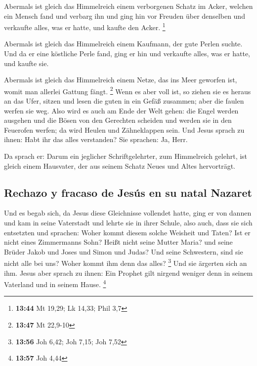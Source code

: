  Abermals ist gleich das Himmelreich einem verborgenen
Schatz im Acker, welchen ein Mensch fand und verbarg ihn und ging hin
vor Freuden über denselben und verkaufte alles, was er hatte, und kaufte
den Acker. \footnote{\textbf{13:44} Mt 19,29; Lk 14,33; Phil 3,7}

 Abermals ist gleich das Himmelreich einem Kaufmann, der
gute Perlen suchte.  Und da er eine köstliche Perle fand,
ging er hin und verkaufte alles, was er hatte, und kaufte sie.

 Abermals ist gleich das Himmelreich einem Netze, das ins
Meer geworfen ist, womit man allerlei Gattung fängt. \footnote{\textbf{13:47}
  Mt 22,9-10}  Wenn es aber voll ist, so ziehen sie es
heraus an das Ufer, sitzen und lesen die guten in ein Gefäß zusammen;
aber die faulen werfen sie weg.  Also wird es auch am
Ende der Welt gehen: die Engel werden ausgehen und die Bösen von den
Gerechten scheiden  und werden sie in den Feuerofen
werfen; da wird Heulen und Zähneklappen sein.  Und Jesus
sprach zu ihnen: Habt ihr das alles verstanden? Sie sprachen: Ja, Herr.

 Da sprach er: Darum ein jeglicher Schriftgelehrter, zum
Himmelreich gelehrt, ist gleich einem Hausvater, der aus seinem Schatz
Neues und Altes hervorträgt.

\hypertarget{rechazo-y-fracaso-de-jesuxfas-en-su-natal-nazaret}{%
\subsection{Rechazo y fracaso de Jesús en su natal
Nazaret}\label{rechazo-y-fracaso-de-jesuxfas-en-su-natal-nazaret}}

 Und es begab sich, da Jesus diese Gleichnisse vollendet
hatte, ging er von dannen  und kam in seine Vaterstadt
und lehrte sie in ihrer Schule, also auch, dass sie sich entsetzten und
sprachen: Woher kommt diesem solche Weisheit und Taten? 
Ist er nicht eines Zimmermanns Sohn? Heißt nicht seine Mutter Maria? und
seine Brüder Jakob und Joses und Simon und Judas?  Und
seine Schwestern, sind sie nicht alle bei uns? Woher kommt ihm denn das
alles? \footnote{\textbf{13:56} Joh 6,42; Joh 7,15; Joh 7,52}
 Und sie ärgerten sich an ihm. Jesus aber sprach zu
ihnen: Ein Prophet gilt nirgend weniger denn in seinem Vaterland und in
seinem Hause. \footnote{\textbf{13:57} Joh 4,44}


